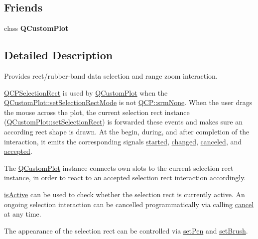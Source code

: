\subsection*{Friends}
\begin{DoxyCompactItemize}
\item 
\mbox{\label{classQCPSelectionRect_a1cdf9df76adcfae45261690aa0ca2198}} 
class {\bfseries Q\+Custom\+Plot}
\end{DoxyCompactItemize}


\subsection{Detailed Description}
Provides rect/rubber-\/band data selection and range zoom interaction. 

\hyperlink{classQCPSelectionRect}{Q\+C\+P\+Selection\+Rect} is used by \hyperlink{classQCustomPlot}{Q\+Custom\+Plot} when the \hyperlink{classQCustomPlot_a810ef958ebe84db661c7288b526c0deb}{Q\+Custom\+Plot\+::set\+Selection\+Rect\+Mode} is not \hyperlink{namespaceQCP_ac9aa4d6d81ac76b094f9af9ad2d3aacfa9032f170490d67240a6c68c2638ffab1}{Q\+C\+P\+::srm\+None}. When the user drags the mouse across the plot, the current selection rect instance (\hyperlink{classQCustomPlot_a0c09f96df15faa4799ad7051bb16cf33}{Q\+Custom\+Plot\+::set\+Selection\+Rect}) is forwarded these events and makes sure an according rect shape is drawn. At the begin, during, and after completion of the interaction, it emits the corresponding signals \hyperlink{classQCPSelectionRect_a7b7162d19f4f2174d3644ff1a5d335aa}{started}, \hyperlink{classQCPSelectionRect_a1bab11026bca52740c2e6682623e6964}{changed}, \hyperlink{classQCPSelectionRect_aeb82009393c90130102dccf36477b906}{canceled}, and \hyperlink{classQCPSelectionRect_a15a43542e1f7b953a44c260b419e6d2c}{accepted}.

The \hyperlink{classQCustomPlot}{Q\+Custom\+Plot} instance connects own slots to the current selection rect instance, in order to react to an accepted selection rect interaction accordingly.

\hyperlink{classQCPSelectionRect_ad27c1569c6ea8fa48e24b81e2a302df3}{is\+Active} can be used to check whether the selection rect is currently active. An ongoing selection interaction can be cancelled programmatically via calling \hyperlink{classQCPSelectionRect_af67bc58f4f5ce9a4dc420b9c42de235a}{cancel} at any time.

The appearance of the selection rect can be controlled via \hyperlink{classQCPSelectionRect_ada20b7fb1b2dcbe50523262636b06963}{set\+Pen} and \hyperlink{classQCPSelectionRect_ab0c66f1484418782efa01f4153611080}{set\+Brush}.

